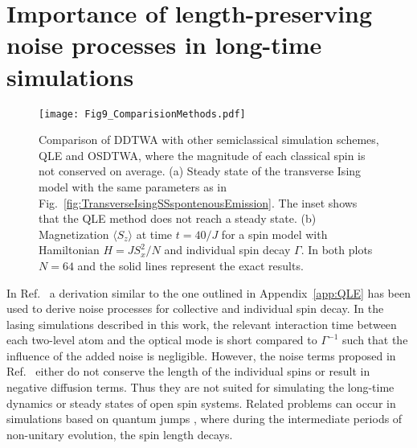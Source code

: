 \documentclass[pra,twocolumn,showpacs,preprintnumbers,amsmath,amssymb,superscriptaddress]{revtex4-1}
\newcommand{\erw}[1]{\langle#1\rangle}
\begin{document}
%
%





\section{Importance of length-preserving noise processes in long-time simulations} \label{app:Comparison} 

\begin{figure}[t]
	\centering
	\texttt{[image: Fig9\_ComparisionMethods.pdf]}
	\caption{Comparison of DDTWA with other semiclassical simulation schemes, QLE and OSDTWA, where the magnitude of each classical spin is not conserved on average. (a) Steady state of the transverse Ising model with the same parameters as in Fig.~\ref{fig:TransverseIsingSSspontenousEmission}. The inset shows that the QLE method does not reach a steady state. (b) Magnetization $\erw{S_z}$ at time $t=40/J$ for a spin model with Hamiltonian $H= J  S_x^2/N$ and individual spin decay $\Gamma$. In both plots $N=64$ and the solid lines represent the exact results. }
	\label{fig:comparision}
\end{figure}


In Ref.~\cite{Liu2020} a derivation similar to the one outlined in Appendix~\ref{app:QLE} has been used to derive noise processes for collective and individual spin decay. In the lasing simulations described in this work, the relevant interaction time between each two-level atom and the optical mode is short compared to $\Gamma^{-1}$ such that the influence of the added noise is negligible. However, the noise terms proposed in Ref.~\cite{Liu2020} either do not conserve the length of the individual spins or result in negative diffusion terms. Thus they are not suited for simulating the long-time dynamics or steady states of open spin systems. Related problems can occur in simulations based on quantum jumps \cite{Singh2021}, where during the intermediate periods of non-unitary evolution, the spin length decays. 
\end{document}
